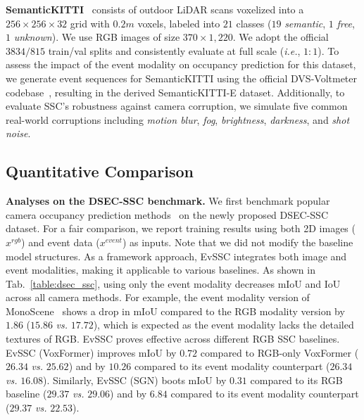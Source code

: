\noindent \textbf{SemanticKITTI}~\cite{behley2019semantickitti} consists of outdoor LiDAR scans voxelized into a $256{\times}256{\times}32$ grid with $0.2m$ voxels, labeled into $21$ classes ($19$ \emph{semantic}, $1$ \emph{free}, $1$ \emph{unknown}). 
We use RGB images of size $370{\times}1,220$. We adopt the official $3834/815$ train/val splits and consistently evaluate at full scale (\textit{i.e.}, $1{:}1$). 
To assess the impact of the event modality on occupancy prediction for this dataset, we generate event sequences for SemanticKITTI using the official DVS-Voltmeter codebase~\cite{lin2022dvs}, resulting in the derived SemanticKITTI-E dataset. 
Additionally, to evaluate SSC's robustness against camera corruption, we simulate five common real-world corruptions including \emph{motion blur}, \emph{fog}, \emph{brightness}, \emph{darkness}, and \emph{shot noise}.

\subsection{Quantitative Comparison}
\noindent \textbf{Analyses on the DSEC-SSC benchmark.} 
We first benchmark popular camera occupancy prediction methods~\cite{cao2022monoscene,zhang2023occformer,li2023voxformer,mei2024sgn} on the newly proposed DSEC-SSC dataset. 
For a fair comparison, we report training results using both 2D images ($x^{rgb}$) and event data ($x^{event}$) as inputs. 
Note that we did not modify the baseline model structures. 
As a framework approach, EvSSC integrates both image and event modalities, making it applicable to various baselines. 
As shown in Tab.~\ref{table:dsec_ssc}, using only the event modality decreases mIoU and IoU across all camera methods. 
For example, the event modality version of MonoScene~\cite{cao2022monoscene} shows a drop in mIoU compared to the RGB modality version by $1.86$ ($15.86$ \textit{vs.} $17.72$), which is expected as the event modality lacks the detailed textures of RGB. 
EvSSC proves effective across different RGB SSC baselines. 
EvSSC (VoxFormer) improves mIoU by $0.72$ compared to RGB-only VoxFormer ($26.34$ \textit{vs.} $25.62$) and by $10.26$ compared to its event modality counterpart ($26.34$ \textit{vs.} $16.08$). Similarly, EvSSC (SGN) boots mIoU by $0.31$ compared to its RGB baseline ($29.37$ \textit{vs.} $29.06$) and by $6.84$ compared to its event modality counterpart ($29.37$ \textit{vs.} $22.53$).
%

